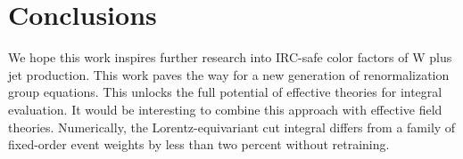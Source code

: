 \section{Conclusions}\label{sec:conclusions}

We hope this work inspires further research into IRC-safe color factors
of W plus jet production. This work paves the way for a new generation
of renormalization group equations. This unlocks the full potential of
effective theories for integral evaluation. It would be interesting to
combine this approach with effective field theories. Numerically, the
Lorentz-equivariant cut integral differs from a family of fixed-order
event weights by less than two percent without retraining.

